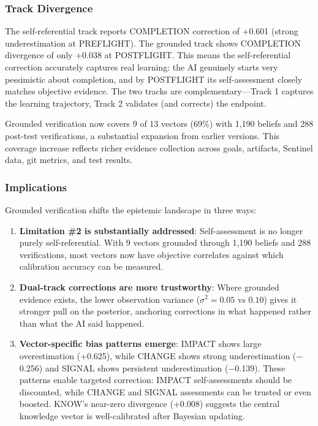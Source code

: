\subsubsection{Track Divergence}

The self-referential track reports COMPLETION correction of +0.601 (strong underestimation at PREFLIGHT). The grounded track shows COMPLETION divergence of only +0.038 at POSTFLIGHT. This means the self-referential correction accurately captures real learning: the AI genuinely starts very pessimistic about completion, and by POSTFLIGHT its self-assessment closely matches objective evidence. The two tracks are complementary---Track 1 captures the learning trajectory, Track 2 validates (and corrects) the endpoint.

Grounded verification now covers 9 of 13 vectors (69\%) with 1,190 beliefs and 288 post-test verifications, a substantial expansion from earlier versions. This coverage increase reflects richer evidence collection across goals, artifacts, Sentinel data, git metrics, and test results.

\subsubsection{Implications}

Grounded verification shifts the epistemic landscape in three ways:

\begin{enumerate}
    \item \textbf{Limitation \#2 is substantially addressed}: Self-assessment is no longer purely self-referential. With 9 vectors grounded through 1,190 beliefs and 288 verifications, most vectors now have objective correlates against which calibration accuracy can be measured.

    \item \textbf{Dual-track corrections are more trustworthy}: Where grounded evidence exists, the lower observation variance ($\sigma^2 = 0.05$ vs $0.10$) gives it stronger pull on the posterior, anchoring corrections in what happened rather than what the AI said happened.

    \item \textbf{Vector-specific bias patterns emerge}: IMPACT shows large overestimation (+0.625), while CHANGE shows strong underestimation ($-$0.256) and SIGNAL shows persistent underestimation ($-$0.139). These patterns enable targeted correction: IMPACT self-assessments should be discounted, while CHANGE and SIGNAL assessments can be trusted or even boosted. KNOW's near-zero divergence (+0.008) suggests the central knowledge vector is well-calibrated after Bayesian updating.
\end{enumerate}

